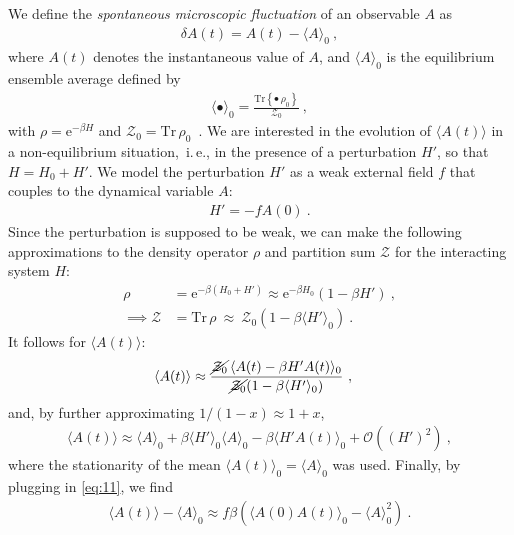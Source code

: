 \documentclass[a4paper]{article}
\begin{document}
We define the \emph{spontaneous microscopic fluctuation} of an observable $A$ as
\begin{align}
    \delta A(t) = A(t) - \langle A \rangle_0~,
    \label{eq:9}
\end{align}
where $A(t)$ denotes the instantaneous value of $A$, and $\langle A \rangle_0$ is the equilibrium ensemble average defined by
\begin{align}
    \langle \bullet \rangle_0 = \frac{\text{Tr} \left\{ \bullet \, \rho_0 \right\}}{\mathcal{Z}_0}~,
    \label{eq:10}
\end{align}
with $\rho = \text{e}^{-\beta H}$ and $\mathcal Z_0 = \text{Tr} \, \rho_0$~.
We are interested in the evolution of $\langle A(t) \rangle$ in a non-equilibrium situation,~i.\,e., in the presence of a perturbation $H'$, so that~$H = H_0 + H'$. We model the perturbation $H'$ as a weak external field $f$ that couples to the dynamical variable $A$:
\begin{align}
    H' = - f A(0)~.
    \label{eq:11}
\end{align}
Since the perturbation is supposed to be weak, we can make the following approximations to the density operator $\rho$ and partition sum $\mathcal{Z}$ for the interacting system $H$:
\begin{align}
    \rho &= \text{e}^{- \beta (H_0 + H')} \approx \text{e}^{- \beta H_0} (1 - \beta H')~,
    \label{eq:12} \\
    \implies \mathcal{Z} &= \text{Tr} \, \rho ~\approx~ \mathcal{Z}_0 ( 1 - \beta \langle H' \rangle_0 )~.
    \label{eq:13}
\end{align}
It follows for $\langle A(t) \rangle$:
\begin{align}
    \langle A(t) \rangle 
    &\approx \frac{ \cancel{\mathcal{Z}_0} \, \langle A(t) - \beta H' A(t) \rangle_0}{\cancel{\mathcal{Z}_0} (1 - \beta \langle H' \rangle_0)}~,
    \label{eq:14}
\end{align}
and, by further approximating $ 1 /(1 - x) \approx 1 + x$,
\begin{align}
    \langle A(t) \rangle \approx \langle A \rangle_0 + \beta \langle H' \rangle_0 \langle A \rangle_0
    - \beta \langle H' A(t) \rangle_0 + \mathcal{O} \left( (H')^2 \right)~,
    \label{eq:15}
\end{align}
where the stationarity of the mean $\langle A(t) \rangle_0 = \langle A \rangle_0$ was used. Finally, by plugging in \eqref{eq:11}, we find
\begin{align}
    \langle A(t) \rangle - \langle A \rangle_0 
    \approx f \beta \left( \langle A(0) A(t) \rangle_0 - \langle A \rangle_0^2 \right)~.
    \label{eq:16}
\end{align}
\end{document}
